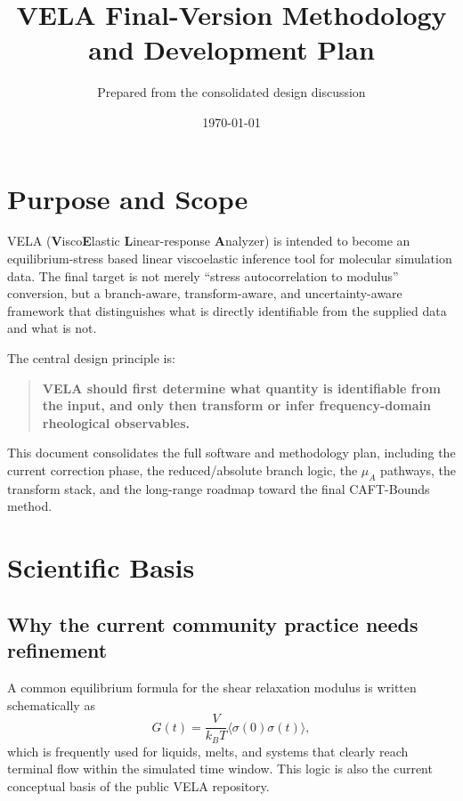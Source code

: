 \documentclass[11pt]{article}
\title{VELA Final-Version Methodology and Development Plan}
\author{Prepared from the consolidated design discussion}
\date{\today}
\begin{document}
\maketitle

\section{Purpose and Scope}

VELA (\textbf{V}isco\textbf{E}lastic \textbf{L}inear-response \textbf{A}nalyzer) is intended to become an equilibrium-stress based linear viscoelastic inference tool for molecular simulation data. The final target is not merely ``stress autocorrelation to modulus'' conversion, but a branch-aware, transform-aware, and uncertainty-aware framework that distinguishes what is directly identifiable from the supplied data and what is not.

The central design principle is:
\begin{quote}
\textbf{VELA should first determine what quantity is identifiable from the input, and only then transform or infer frequency-domain rheological observables.}
\end{quote}

This document consolidates the full software and methodology plan, including the current correction phase, the reduced/absolute branch logic, the $\mu_A$ pathways, the transform stack, and the long-range roadmap toward the final CAFT-Bounds method.

\section{Scientific Basis}

\subsection{Why the current community practice needs refinement}

A common equilibrium formula for the shear relaxation modulus is written schematically as
\begin{equation}
G(t) = \frac{V}{k_B T}\langle \sigma(0)\sigma(t)\rangle,
\end{equation}
which is frequently used for liquids, melts, and systems that clearly reach terminal flow within the simulated time window. This logic is also the current conceptual basis of the public VELA repository.
\end{document}
